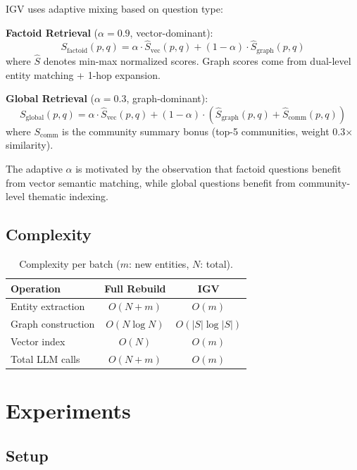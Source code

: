 \documentclass[sigconf,anonymous,review]{acmart}
\begin{document}
IGV uses adaptive mixing based on question type:

\textbf{Factoid Retrieval} ($\alpha{=}0.9$, vector-dominant):
\begin{equation}
\label{eq:factoid}
S_{\text{factoid}}(p,q) = \alpha \cdot \hat{S}_{\text{vec}}(p,q) + (1{-}\alpha) \cdot \hat{S}_{\text{graph}}(p,q)
\end{equation}
where $\hat{S}$ denotes min-max normalized scores. Graph scores come from dual-level entity matching + 1-hop expansion.

\textbf{Global Retrieval} ($\alpha{=}0.3$, graph-dominant):
\begin{equation}
\label{eq:global}
S_{\text{global}}(p,q) = \alpha \cdot \hat{S}_{\text{vec}}(p,q) + (1{-}\alpha) \cdot (\hat{S}_{\text{graph}}(p,q) + \hat{S}_{\text{comm}}(p,q))
\end{equation}
where $S_{\text{comm}}$ is the community summary bonus (top-5 communities, weight 0.3$\times$ similarity).

The adaptive $\alpha$ is motivated by the observation that factoid questions benefit from vector semantic matching, while global questions benefit from community-level thematic indexing.

\subsection{Complexity}

\begin{table}[t]
\centering
\caption{Complexity per batch ($m$: new entities, $N$: total).}
\label{tab:complexity}
\small
\begin{tabular}{lcc}
\toprule
Operation & Full Rebuild & IGV \\
\midrule
Entity extraction & $O(N{+}m)$ & $O(m)$ \\
Graph construction & $O(N\log N)$ & $O(|S|\log|S|)$ \\
Vector index & $O(N)$ & $O(m)$ \\
Total LLM calls & $O(N{+}m)$ & $O(m)$ \\
\bottomrule
\end{tabular}
\end{table}

\section{Experiments}

\subsection{Setup}
\end{document}
